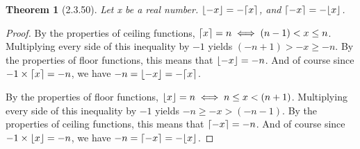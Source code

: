 \documentclass[a4paper, 12pt]{article}
\theoremstyle{plain}
\newtheorem*{theorem*}{Theorem}
\DeclarePairedDelimiter{\floor}{\lfloor}{\rfloor}
\DeclarePairedDelimiter{\ceil}{\lceil}{\rceil}
\begin{document}
	
	\begin{theorem*}[2.3.50]
		Let x be a real number. \newline $\floor{-x} = -\ceil{x}$, and $\ceil{-x} = -\floor{x}$.
	\end{theorem*}
	
	\begin{proof}
		By the properties of ceiling functions, \newline $\ceil{x} = n \iff (n-1) < x \le n$. Multiplying every side of this inequality by $-1$ yields $(-n + 1) > -x \ge -n$. By the properties of floor functions, this means that $\floor{-x} = -n$. And of course since $-1 \times \ceil{x} = -n$, we have $-n = \floor{-x} = -\ceil{x}$.
		
		By the properties of floor functions, \newline $\floor{x} = n \iff n \le x < (n+1)$. Multiplying every side of this inequality by $-1$ yields $-n \ge -x > (-n-1)$. By the properties of ceiling functions, this means that $\ceil{-x} = -n$. And of course since $-1 \times \floor{x} = -n$, we have $-n = \ceil{-x} = -\floor{x}$.
	\end{proof}
\end{document}
